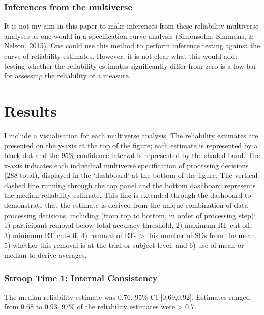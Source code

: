 \documentclass[
  english,
  man,floatsintext]{apa6}
\begin{document}
\hypertarget{inferences-from-the-multiverse}{%
\subsubsection{Inferences from the multiverse}\label{inferences-from-the-multiverse}}

It is not my aim in this paper to make inferences from these reliability multiverse analyses as one would in a specification curve analysis (Simonsohn, Simmons, \& Nelson, 2015). One could use this method to perform inference testing against the curve of reliability estimates. However, it is not clear what this would add: testing whether the reliability estimates significantly differ from zero is a low bar for assessing the reliability of a measure.

\hypertarget{results}{%
\section{Results}\label{results}}

I include a visualisation for each multiverse analysis. The reliability estimates are presented on the y-axis at the top of the figure; each estimate is represented by a black dot and the 95\% confidence interval is represented by the shaded band. The x-axis indicates each individual multiverse specification of processing decisions (288 total), displayed in the `dashboard' at the bottom of the figure. The vertical dashed line running through the top panel and the bottom dashboard represents the median reliability estimate. This line is extended through the dashboard to demonstrate that the estimate is derived from the unique combination of data processing decisions, including (from top to bottom, in order of processing step); 1) participant removal below total accuracy threshold, 2) maximum RT cut-off, 3) minimum RT cut-off, 4) removal of RTs \textgreater{} this number of SDs from the mean, 5) whether this removal is at the trial or subject level, and 6) use of mean or median to derive averages.

\newpage

\hypertarget{stroop-time-1-internal-consistency}{%
\subsubsection{Stroop Time 1: Internal Consistency}\label{stroop-time-1-internal-consistency}}

The median reliability estimate was 0.76, 95\% CI {[}0.69,0.92{]}. Estimates ranged from 0.68 to 0.93. 97\% of the reliability estimates were \textgreater{} 0.7.
\end{document}
